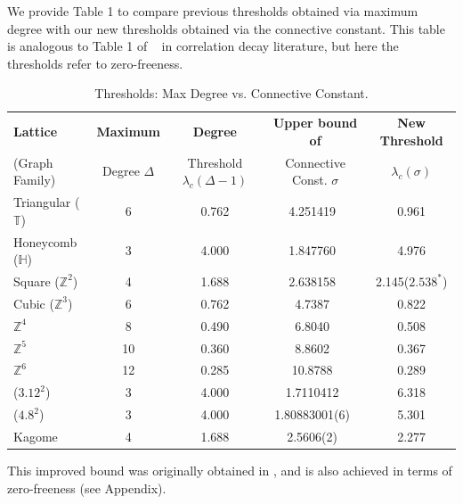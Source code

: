 \documentclass[a4paper,11pt]{article}
\theoremstyle{plain}
\theoremstyle{definition}
\theoremstyle{remark}
\newcommand{\1}{\mathbf{1}}
\begin{document}
We provide Table 1 to compare previous thresholds obtained via maximum degree with our new thresholds obtained via the connective constant. 
This table is analogous to Table 1 of ~\cite{sinclair2017spatial} in correlation decay literature, 
but here the thresholds refer to zero-freeness. 

\begin{table}[htbp]
    \centering
    \small 
    \setlength{\tabcolsep}{3pt}     
    
    \label{tab:zerofree_comparison}
    \begin{tabular}{lcccc}
        \toprule
        \textbf{Lattice} & \textbf{Maximum } & \textbf{Degree} & \textbf{Upper bound of } & \textbf{New Threshold} \\
        (Graph Family) & Degree $\Delta$ & Threshold $\lambda_c(\Delta-1)$ & Connective Const. $\sigma$ & $\lambda_c(\sigma)$ \\
        \midrule
        Triangular ($\mathbb{T}$) & 6 & 0.762 & 4.251419~\cite{alm2005upper} & 0.961 \\
        Honeycomb ($\mathbb{H}$) & 3 & 4.000 & 1.847760~\cite{duminil2012connective} & 4.976 \\
        Square ($\mathbb{Z}^2$) & 4 & 1.688 & 2.638158~\cite{jacobsen2016growth} & 2.145($2.538^*$) \\
        Cubic ($\mathbb{Z}^3$) & 6 & 0.762 & 4.7387~\cite{ponitz2000improved} & 0.822 \\
        $\mathbb{Z}^4$ & 8 & 0.490 & 6.8040~\cite{ponitz2000improved} & 0.508 \\
        $\mathbb{Z}^5$ & 10 & 0.360 & 8.8602~\cite{ponitz2000improved} & 0.367 \\
        $\mathbb{Z}^6$ & 12 & 0.285 & 10.8788~\cite{slade1994self} & 0.289 \\
        ($3.12^2$) & 3 & 4.000 & 1.7110412~\cite{jensen1998self} & 6.318 \\
        ($4.8^2$) & 3 & 4.000 & 1.80883001(6)~\cite{jensen1998self} & 5.301 \\
        Kagome & 4 & 1.688 & 2.5606(2)~\cite{jensen1998self} & 2.277 \\
        \bottomrule
    \end{tabular}
    \begin{tablenotes}
        \footnotesize
        \item * This improved bound was originally obtained in \cite{sinclair2017spatial}, and is also achieved in terms of zero-freeness (see Appendix). 
    \end{tablenotes}
    \caption{Thresholds: Max Degree vs. Connective Constant. }
\end{table}
\end{document}

